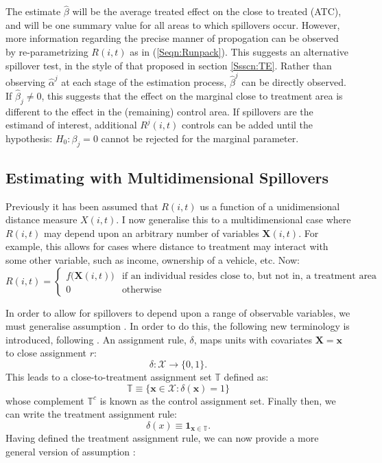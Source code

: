 The estimate $\hat\beta$ will be the average treated effect on the close to treated
(ATC), and will be one summary value for all areas to which spillovers occur.  
However, more information regarding the precise manner of propogation can be observed
by re-parametrizing $R(i,t)$ as in (\ref{Seqn:Runpack}).  This suggests an 
alternative spillover test, in the style of that proposed in section \ref{Ssscn:TE}.
Rather than observing $\hat\alpha^j$ at each stage of the estimation process, 
$\hat\beta^j$ can be directly observed.  If $\hat\beta_j\neq 0$, this suggests that
the effect on the marginal close to treatment area is different to the effect in 
the (remaining) control area.  If spillovers are the estimand of interest, 
additional $R^j(i,t)$ controls can be added until the hypothesis: $H_0: \beta_j = 0$ 
cannot be rejected for the marginal parameter.

\subsection{Estimating with Multidimensional Spillovers}
\label{Ssscn:multi}
Previously it has been assumed that $R(i,t)$ us a function of a unidimensional 
distance measure $X(i,t)$.  I now generalise this to a multidimensional case where
$R(i,t)$ may depend upon an arbitrary number of variables $\mathbf{X}(i,t)$.  For
example, this allows for cases where distance to treatment may interact with some 
other variable, such as income, ownership of a vehicle, etc.  Now:
\begin{equation}
\nonumber
 R(i,t) =
  \begin{cases}
   f\Big(\mathbf{X}(i,t)\Big)   & \text{if an individual resides close to, but not in, a treatment area} \\
   0                            & \text{otherwise} 
  \end{cases}
\end{equation}

In order to allow for spillovers to depend upon a range of observable variables,
we must generalise assumption .  In order to do this, the
following new terminology is introduced, following \citet{Zajonc2012}. An 
assignment rule, $\delta$, maps units with covariates $\mathbf{X=x}$ to close
assignment $r$:
\[
\delta: \mathcal{X} \rightarrow \{0,1\}.
\]
This leads to a close-to-treatment assignment set $\mathbb{T}$ defined as:
\[
\mathbb{T}\equiv \{ \mathbf{x}\in\mathcal{X}: \delta(\mathbf{x})=1 \}
\]
whose complement $\mathbb{T}^c$ is known as the control assignment
set. Finally then, we can write the treatment assignment rule:
\begin{equation}
\delta(x)\equiv \mathbf{1}_{\mathbf{x}\in\mathbb{T}}.
\end{equation}
Having defined the treatment assignment rule, we can now provide a
more general version of assumption :

